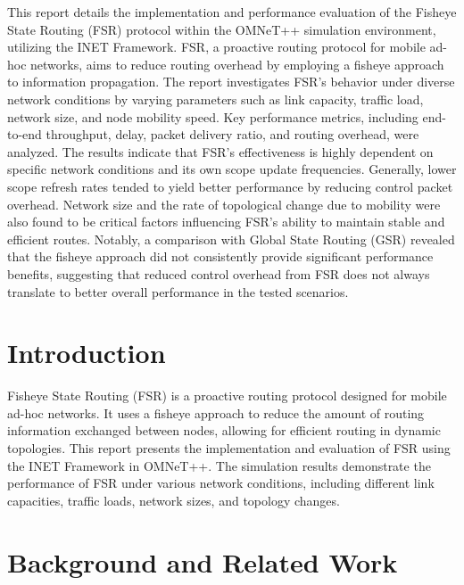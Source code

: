 \documentclass{winslabreport}
\begin{document}
\restoregeometry
\maketitle

\summary
This report details the implementation and performance evaluation of the Fisheye State Routing (FSR) protocol within the OMNeT++ simulation environment, utilizing the INET Framework. FSR, a proactive routing protocol for mobile ad-hoc networks, aims to reduce routing overhead by employing a fisheye approach to information propagation. The report investigates FSR's behavior under diverse network conditions by varying parameters such as link capacity, traffic load, network size, and node mobility speed. Key performance metrics, including end-to-end throughput, delay, packet delivery ratio, and routing overhead, were analyzed. The results indicate that FSR's effectiveness is highly dependent on specific network conditions and its own scope update frequencies. Generally, lower scope refresh rates tended to yield better performance by reducing control packet overhead. Network size and the rate of topological change due to mobility were also found to be critical factors influencing FSR's ability to maintain stable and efficient routes. Notably, a comparison with Global State Routing (GSR) revealed that the fisheye approach did not consistently provide significant performance benefits, suggesting that reduced control overhead from FSR does not always translate to better overall performance in the tested scenarios.

\tableofcontents
\listoffigures
\body


\section{Introduction}

Fisheye State Routing (FSR) is a proactive routing protocol designed for mobile ad-hoc networks. It uses a fisheye approach to reduce the amount of routing information exchanged between nodes, allowing for efficient routing in dynamic topologies. This report presents the implementation and evaluation of FSR using the INET Framework in OMNeT++. The simulation results demonstrate the performance of FSR under various network conditions, including different link capacities, traffic loads, network sizes, and topology changes.

\section{Background and Related Work}
\end{document}
